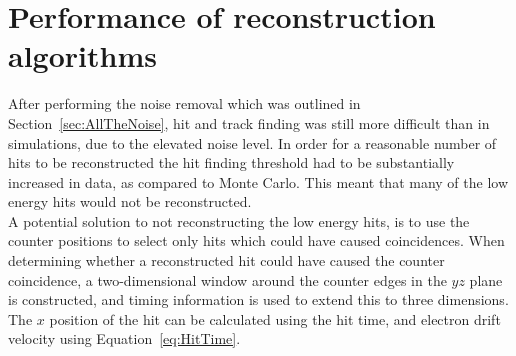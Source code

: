 \section{Performance of reconstruction algorithms} \label{sec:DataAlgs}  %
After performing the noise removal which was outlined in Section~\ref{sec:AllTheNoise}, hit and track finding was still more difficult than in simulations, due to the elevated noise level. In order for a reasonable number of hits to be reconstructed the hit finding threshold had to be substantially increased in data, as compared to Monte Carlo. This meant that many of the low energy hits would not be reconstructed. \\

A potential solution to not reconstructing the low energy hits, is to use the counter positions to select only hits which could have caused coincidences. When determining whether a reconstructed hit could have caused the counter coincidence, a two-dimensional window around the counter edges in the $yz$ plane is constructed, and timing information is used to extend this to three dimensions. The $x$ position of the hit can be calculated using the hit time, and electron drift velocity using Equation~\ref{eq:HitTime}. \\

